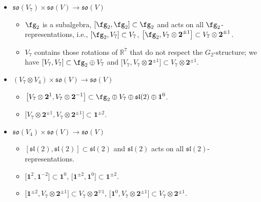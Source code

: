 \documentclass[10pt,a4paper]{amsart}
\numberwithin{equation}{section}
\theoremstyle{definition}
\def\R{\mathbb{R}}
\def\lie#1{\ensuremath{\mathfrak{#1}}}
\def\so{\lie{so}}
\begin{document}
\begin{itemize}\itemsep=0pt
 \item[]\underline{$\lie{so}(V_7) \times \so(V) \longrightarrow \lie{so}(V)$}
 \begin{itemize}\itemsep=0pt
 \item[--] $\fg_2$ is a subalgebra, $[\fg_2 , \fg_2] \subset \fg_2$ and acts on all $\fg_2$-representations, i.e., $[\fg_2, V_7] \subset V_7$, $\big[\fg_2, V_7 \otimes \textbf{2}^{\pm 1}\big] \subset V_7 \otimes \textbf{2}^{\pm 1}$.
 \item[--] $V_7$ contains those rotations of $\R^7$ that do not respect the $G_2$-structure; we have $[V_7,V_7] \subset \fg_2 \oplus V_7$ and $\big[V_7, V_7 \otimes \textbf{2}^{\pm 1}\big] \subset V_7 \otimes \textbf{2}^{\pm 1}$.
 \end{itemize}
 \item[]\underline{$(V_7 \otimes V_4) \times \so(V) \longrightarrow \lie{so}(V)$}
 \begin{itemize}\itemsep=0pt
 \item[--] $\big[V_7 \otimes \textbf{2}^{1}, V_7 \otimes \textbf{2}^{-1}\big] \subset \fg_2 \oplus V_7 \oplus \lie{sl}(2) \oplus \textbf{1}^0$.
 \item[--] $\big[V_7 \otimes \textbf{2}^{\pm 1}, V_7 \otimes \textbf{2}^{\pm 1}\big] \subset \textbf{1}^{\pm 2}$.
 \end{itemize}
 \item[] \underline{$\lie{so}(V_4) \times \so(V) \longrightarrow \lie{so}(V)$}
 \begin{itemize}\itemsep=0pt
 \item[--] $[\lie{sl}(2), \lie{sl}(2)] \subset \lie{sl}(2)$ and $\lie{sl}(2)$ acts on all $\lie{sl}(2)$-representations.
 \item[--] $\big[\textbf{1}^2,\textbf{1}^{-2}\big] \subset \textbf{1}^0$, $\big[\textbf{1}^{\pm 2},\textbf{1}^{0}\big] \subset \textbf{1}^{\pm 2}$.
 \item[--] $\big[\textbf{1}^{\pm 2} , V_7 \otimes \textbf{2}^{\pm 1}\big] \subset V_7 \otimes \textbf{2}^{\mp 1}$, $\big[\textbf{1}^{0} , V_7 \otimes \textbf{2}^{\pm 1}\big] \subset V_7 \otimes \textbf{2}^{\pm 1}$.
 \end{itemize}
\end{itemize}
\end{document}
